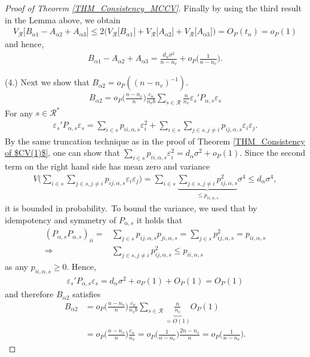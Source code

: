 \documentclass[Research_Module_ES.tex]{subfiles}
\begin{document}
\begin{proof}[Proof of Theorem \ref{THM_Consistency_MCCV}]
	Finally by using the third result in the Lemma above, we obtain
	\begin{align*}
	V_\mathcal{R}\bigl[B_{\alpha1}-A_{\alpha2}+A_{\alpha3}\bigr] \le 2\bigl(V_\mathcal{R}\bigl[B_{\alpha1}\bigr]+V_\mathcal{R}\bigl[A_{\alpha2}\bigr]+V_\mathcal{R}\bigl[A_{\alpha3}\bigr]\bigr) = O_P(t_n)=o_P(1)
	\end{align*}
	and hence,
	\begin{align*}
	B_{\alpha1}-A_{\alpha2}+A_{\alpha3} = \frac{d_\alpha\sigma^2 }{n-n_v}+ o_P\biggl(\frac{1}{n-n_v}\biggr).
	\end{align*}
	
	(4.) Next we show that $B_{\alpha2} = o_P((n-n_v)^{-1})$.
	\begin{align*}
	B_{\alpha2} = o_P\biggl(\frac{n-n_v}{n}\biggr)\frac{c_n}{n_vb}\sum_{s\in\mathcal{R}}\frac{n}{n_v}\varepsilon_s'P_{\alpha,s}\varepsilon_s
	\end{align*}
	For any $s\in \mathcal{R}^\ast$
	\begin{align*}
	\varepsilon_s'P_{\alpha,s}\varepsilon_s = \sum_{i\in s} p_{ii,\alpha,s} \varepsilon_i^2 + \sum_{i \in s}\sum_{j\in s, j\neq i}  p_{ij,\alpha,s} \varepsilon_i\varepsilon_j.
	\end{align*}
	By the same truncation technique as in the proof of Theorem \ref{THM_Consistency of $CV(1)$}, one can show that $\sum_{i\in s} p_{ii,\alpha,s} \varepsilon_i^2 = d_\alpha\sigma^2 + o_P(1)$. Since the second term on the right hand side has mean zero and variance
	\begin{align*}
	V\biggl( \sum_{i \in s}\sum_{j\in s, j\neq i}  p_{ij,\alpha,s} \varepsilon_i\varepsilon_j\biggr) =  \sum_{i \in s}
	\underbrace{\sum_{j\in s, j\neq i}  p_{ij,\alpha,s}^2}_{\le p_{ii,\alpha,s}} \sigma^4 \le d_\alpha \sigma^4,
	\end{align*}
	it is bounded in probability.\
	To bound the variance, we used that by idempotency and symmetry of $P_{\alpha,s}$ it holds that
	\begin{align*}
	(P_{\alpha,s}P_{\alpha,s})_{ii} = &\sum_{j \in s} p_{ij,\alpha,s} p_{ji,\alpha,s} = \sum_{j \in s} p_{ij,\alpha,s}^2 = p_{ii,\alpha,s} \\
	\Rightarrow &\sum_{j \in s, j\neq i}p_{ij,\alpha,s}^2 \le p_{ii,\alpha,s}
	\end{align*}
	as any $p_{ii,\alpha,s} \ge 0$. Hence, 
	\begin{align*}
	\varepsilon_s'P_{\alpha,s}\varepsilon_s = d_\alpha\sigma^2 + o_P(1) + O_P(1) = O_P(1)
	\end{align*}
	and therefore $B_{\alpha2}$ satisfies
	\begin{align*}
	B_{\alpha2} &= o_P\biggl(\frac{n-n_v}{n}\biggr)\frac{c_n}{n_vb}\sum_{s\in\mathcal{R}}\underbrace{\frac{n}{n_v}}_{=O(1)}O_P(1)\\
	&= o_P\biggl(\frac{n-n_v}{n}\biggr)\frac{c_n}{n_v} = o_P\biggl(\frac{1}{n-n_v}\biggr)\frac{2n-n_v}{n} = o_P\biggl(\frac{1}{n-n_v}\biggr).
	\end{align*}
	

\end{proof}
\end{document}
